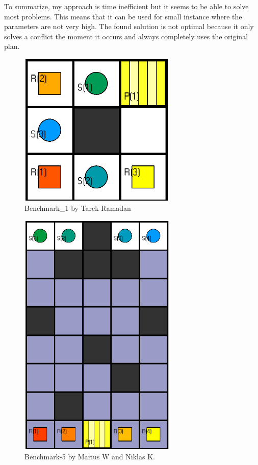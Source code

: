 \documentclass[runningheads]{llncs}
\begin{document}
To summarize, my approach is time inefficient but it seems to be able to solve most problems. This means that it can be used for small instance where the parameters are not very high. The found solution is not optimal because it only solves a conflict the moment it occurs and always completely uses the original plan.       

\begin{figure}[h]
\includegraphics[width=75mm]{Images/Instance 1}
\caption{Benchmark\_1 by Tarek Ramadan}
\label{fig:I1}
\end{figure}

\begin{figure}[h]
\includegraphics[width=75mm]{Images/Instance 2}
\caption{Benchmark-5 by Marius W and Niklas K.}
\label{fig:I2}
\end{figure}
\end{document}
